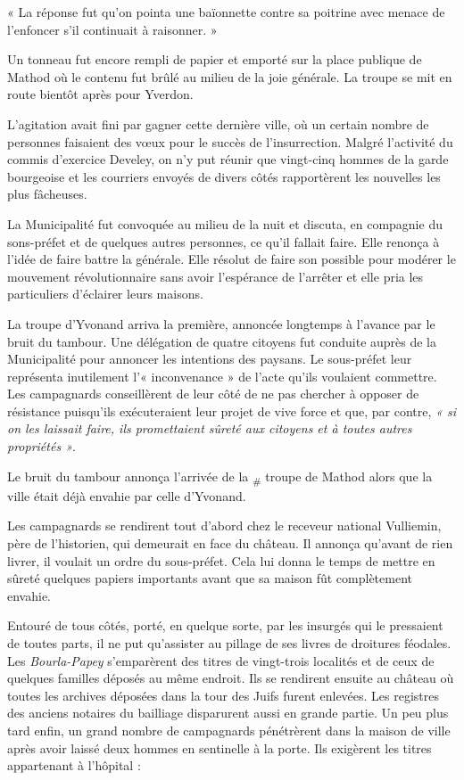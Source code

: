 \documentclass[french,twoside]{book} %
\newenvironment{quoteblock}%
  {\begin{quoting}}
  {\end{quoting}}
\newenvironment{quotebar}{%
    \def\FrameCommand{{\color{rubric!10!}\vrule width 0.5em} \hspace{0.9em}}%
    \def\OuterFrameSep{\itemsep} %
    \MakeFramed {\advance\hsize-\width \FrameRestore}
  }%
  {%
    \endMakeFramed
  }
\renewenvironment{quoteblock}%
  {%
    \savenotes
    \setstretch{0.9}
    \begin{quotebar}
  }
  {%
    \end{quotebar}
    \spewnotes
  }
\begin{document}
\begin{quoteblock}
\noindent « La réponse fut qu’on pointa une baïonnette contre sa poitrine avec menace de l’enfoncer s’il continuait à raisonner. »\end{quoteblock}

\noindent Un tonneau fut encore rempli de papier et emporté sur la place publique de Mathod où le contenu fut brûlé au milieu de la joie générale. La troupe se mit en route bientôt après pour Yverdon.\par
L’agitation avait fini par gagner cette dernière ville, où un certain nombre de personnes faisaient des vœux pour le succès de l’insurrection. Malgré l’activité du commis d’exercice Develey, on n’y put réunir que vingt-cinq hommes de la garde bourgeoise et les courriers envoyés de divers côtés rapportèrent les nouvelles les plus fâcheuses.\par
La Municipalité fut convoquée au milieu de la nuit et discuta, en compagnie du sons-préfet et de quelques autres personnes, ce qu’il fallait faire. Elle renonça à l’idée de faire battre la générale. Elle résolut de faire son possible pour modérer le mouvement révolutionnaire sans avoir l’espérance de l’arrêter et elle pria les particuliers d’éclairer leurs maisons.\par
La troupe d’Yvonand arriva la première, annoncée longtemps à l’avance par le bruit du tambour. Une délégation de quatre citoyens fut conduite auprès de la Municipalité pour annoncer les intentions des paysans. Le sous-préfet leur représenta inutilement l’« inconvenance » de l’acte qu’ils voulaient commettre. Les campagnards conseillèrent de leur côté de ne pas chercher à opposer de résistance puisqu’ils exécuteraient leur projet de vive force et que, par contre, \emph{« si on les laissait faire, ils promettaient sûreté aux citoyens et à toutes autres propriétés »}.\par
Le bruit du tambour annonça l’arrivée de la \textsubscript{\#} troupe de Mathod alors que la ville était déjà envahie par celle d’Yvonand.\par
Les campagnards se rendirent tout d’abord chez le receveur national Vulliemin, père de l’historien, qui demeurait en face du château. Il annonça qu’avant de rien livrer, il voulait un ordre du sous-préfet. Cela lui donna le temps de mettre en sûreté quelques papiers importants avant que sa maison fût complètement envahie.\par
Entouré de tous côtés, porté, en quelque sorte, par les insurgés qui le pressaient de toutes parts, il ne put qu’assister au pillage de ses livres de droitures féodales. Les \emph{Bourla-Papey} s’emparèrent des titres de vingt-trois localités et de ceux de quelques familles déposés au même endroit. Ils se rendirent ensuite au château où toutes les archives déposées dans la tour des Juifs furent enlevées. Les registres des anciens notaires du bailliage disparurent aussi en grande partie. Un peu plus tard enfin, un grand nombre de campagnards pénétrèrent dans la maison de ville après avoir laissé deux hommes en sentinelle à la porte. Ils exigèrent les titres appartenant à l’hôpital :\par
\end{document}
